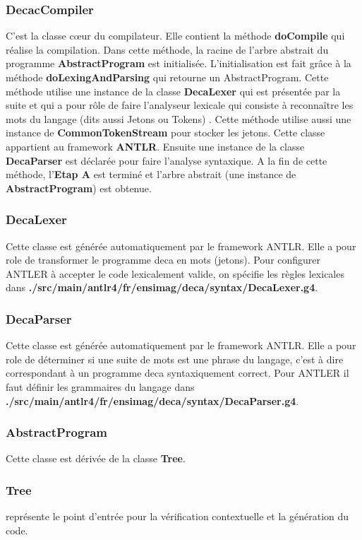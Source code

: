 \documentclass[12pt, a4paper, one side]{article}
\begin{document}
    \subsubsection{DecacCompiler} C'est la classe cœur du compilateur. Elle contient la méthode \textbf{doCompile} qui réalise la compilation. Dans cette méthode, la racine de l'arbre abstrait du programme \textbf{AbstractProgram} est initialisée. L'initialisation est fait grâce à la méthode \textbf{doLexingAndParsing} qui retourne un AbstractProgram. Cette méthode utilise une instance de la classe \textbf{DecaLexer} qui est présentée par la suite et qui a pour rôle de faire l'analyseur lexicale qui consiste à reconnaître les mots du langage (dits aussi Jetons ou Tokens) . Cette méthode utilise aussi une instance de \textbf{CommonTokenStream} pour stocker les
    jetons. Cette classe appartient au framework \textbf{ANTLR}. Ensuite une instance de la classe \textbf{DecaParser} est déclarée pour faire l'analyse syntaxique. A la fin de cette méthode, l'\textbf{Etap A} est terminé et l'arbre abstrait (une instance de \textbf{AbstractProgram}) est obtenue.

    \subsubsection{DecaLexer} Cette classe est générée automatiquement par le framework ANTLR. Elle a pour role de transformer le programme deca en mots (jetons). Pour configurer ANTLER à accepter le code lexicalement valide, on spécifie les règles lexicales dans \textbf{./src/main/antlr4/fr/ensimag/deca/syntax/DecaLexer.g4}.

    \subsubsection{DecaParser} Cette classe est générée automatiquement par le framework ANTLR. Elle a pour role de déterminer si une suite de mots est une phrase du langage, c'est à dire correspondant à un programme deca syntaxiquement correct. Pour ANTLER il faut définir les grammaires du langage dans \textbf{./src/main/antlr4/fr/ensimag/deca/syntax/DecaParser.g4}.
    \subsubsection{AbstractProgram} Cette classe est dérivée de la classe \textbf{Tree}.

    \subsubsection{Tree} représente le point d'entrée pour la vérification contextuelle et la génération du code.
\end{document}
